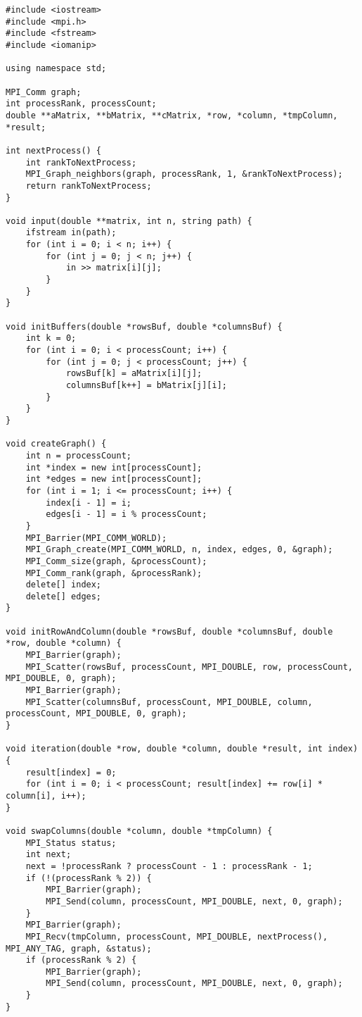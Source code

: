 \documentclass[a4paper,14pt]{extarticle}
\begin{document}
\begin{lstlisting}
#include <iostream> 
#include <mpi.h> 
#include <fstream> 
#include <iomanip> 
  
using namespace std; 
  
MPI_Comm graph; 
int processRank, processCount; 
double **aMatrix, **bMatrix, **cMatrix, *row, *column, *tmpColumn, *result; 
  
int nextProcess() { 
    int rankToNextProcess; 
    MPI_Graph_neighbors(graph, processRank, 1, &rankToNextProcess); 
    return rankToNextProcess; 
} 
  
void input(double **matrix, int n, string path) { 
    ifstream in(path); 
    for (int i = 0; i < n; i++) { 
        for (int j = 0; j < n; j++) { 
            in >> matrix[i][j]; 
        } 
    } 
} 
  
void initBuffers(double *rowsBuf, double *columnsBuf) { 
    int k = 0; 
    for (int i = 0; i < processCount; i++) { 
        for (int j = 0; j < processCount; j++) { 
            rowsBuf[k] = aMatrix[i][j]; 
            columnsBuf[k++] = bMatrix[j][i]; 
        } 
    } 
} 
  
void createGraph() { 
    int n = processCount; 
    int *index = new int[processCount]; 
    int *edges = new int[processCount]; 
    for (int i = 1; i <= processCount; i++) { 
        index[i - 1] = i; 
        edges[i - 1] = i % processCount; 
    } 
    MPI_Barrier(MPI_COMM_WORLD); 
    MPI_Graph_create(MPI_COMM_WORLD, n, index, edges, 0, &graph); 
    MPI_Comm_size(graph, &processCount); 
    MPI_Comm_rank(graph, &processRank); 
    delete[] index; 
    delete[] edges; 
} 
  
void initRowAndColumn(double *rowsBuf, double *columnsBuf, double *row, double *column) { 
    MPI_Barrier(graph); 
    MPI_Scatter(rowsBuf, processCount, MPI_DOUBLE, row, processCount, MPI_DOUBLE, 0, graph); 
    MPI_Barrier(graph); 
    MPI_Scatter(columnsBuf, processCount, MPI_DOUBLE, column, processCount, MPI_DOUBLE, 0, graph); 
} 
  
void iteration(double *row, double *column, double *result, int index) { 
    result[index] = 0; 
    for (int i = 0; i < processCount; result[index] += row[i] * column[i], i++); 
} 
  
void swapColumns(double *column, double *tmpColumn) { 
    MPI_Status status; 
    int next; 
    next = !processRank ? processCount - 1 : processRank - 1; 
    if (!(processRank % 2)) { 
        MPI_Barrier(graph); 
        MPI_Send(column, processCount, MPI_DOUBLE, next, 0, graph); 
    } 
    MPI_Barrier(graph); 
    MPI_Recv(tmpColumn, processCount, MPI_DOUBLE, nextProcess(), MPI_ANY_TAG, graph, &status); 
    if (processRank % 2) { 
        MPI_Barrier(graph); 
        MPI_Send(column, processCount, MPI_DOUBLE, next, 0, graph); 
    } 
} 
  

\end{lstlisting}
\end{document}
